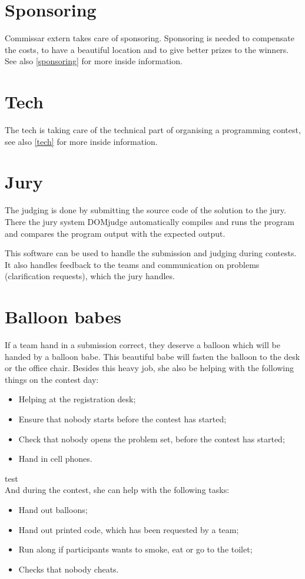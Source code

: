 \section{Sponsoring\label{sponsoringTasks}}
Commissar extern takes care of sponsoring. Sponsoring is needed to compensate the costs, to have a beautiful location and to give better prizes to the winners. See also \ref{sponsoring} for more inside information.
	
\section{Tech}\label{techTasks}
The tech is taking care of the technical part of organising a programming contest, see also \ref{tech} for more inside information.

\section{Jury}\label{Jury}
The judging is done by submitting the source code of the solution to the jury. There the jury system DOMjudge automatically compiles and runs the program and compares the program output with the expected output.

This software can be used to handle the submission and judging during contests. It also handles feedback to the teams and communication on problems (clarification requests), which the jury handles.

\section{Balloon babes}
If a team hand in a submission correct, they deserve a balloon which will be handed by a balloon babe. This beautiful babe will fasten the balloon to the desk or the office chair. Besides this heavy job, she also be helping with the following things on the contest day:
\begin{itemize}
\item Helping at the registration desk;
\item Ensure that nobody starts before the contest has started;
\item Check that nobody opens the problem set, before the contest has started;
\item Hand in cell phones.
\end{itemize}
{\color{white}test}\\
And during the contest, she can help with the following tasks:
\begin{itemize}
\item Hand out balloons;
\item Hand out printed code, which has been requested by a team;
\item Run along if participants wants to smoke, eat or go to the toilet;
\item Checks that nobody cheats.
\end{itemize}

